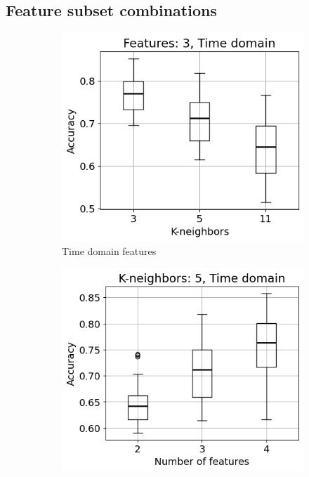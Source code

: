 \subsection{Feature subset combinations}
\begin{figure}[h]
    \centering
    \begin{subfigure}[b]{0.48\textwidth}
        \includegraphics[width=\textwidth]{assets/results/feature-combinations/TD-3-A+B-False-False-F3.png}
        \caption{Time domain features}
    \end{subfigure}
    \hfill
    \begin{subfigure}[b]{0.48\textwidth}
        \includegraphics[width=\textwidth]{assets/results/feature-combinations/TD-3-A+B-False-False-K5.png}

\end{subfigure}
\end{figure}
